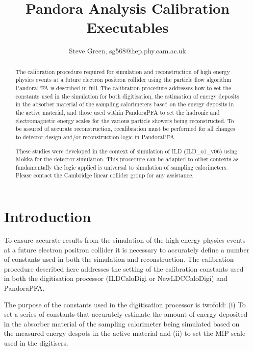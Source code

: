 \documentclass[11pt, oneside]{article}   	%
\title{Pandora Analysis Calibration Executables}
\author{Steve Green, sg568@hep.phy.cam.ac.uk}
\date{}							%
\begin{document}
\maketitle


\begin{abstract}
The calibration procedure required for simulation and reconstruction of high energy physics events at a future electron positron collider using the particle flow algorithm PandoraPFA is described in full.  The calibration procedure addresses how to set the constants used in the simulation for both digitisation, the estimation of energy deposits in the absorber material of the sampling calorimeters based on the energy deposits in the active material, and those used within PandoraPFA to set the hadronic and electromagnetic energy scales for the various particle showers being reconstructed.  To be assured of accurate reconstruction, recalibration must be performed for all changes to detector design and/or  reconstruction logic in PandoraPFA.

These studies were developed in the context of simulation of ILD (ILD\_o1\_v06) using Mokka for the detector simulation.  This procedure can be adapted to other contexts as fundamentally the logic applied is universal to simulation of sampling calorimeters.  Please contact the Cambridge linear collider group for any assistance.
\end{abstract}


\section{Introduction}

To ensure accurate results from the simulation of the high energy physics events at a future electron positron collider it is necessary to accurately define a number of constants used in both the simulation and reconstruction.  The calibration procedure described here addresses the setting of the calibration constants used in both the digitisation processor (ILDCaloDigi or NewLDCCaloDigi) and PandoraPFA.

The purpose of the constants used in the digitisation processor is twofold: (i) To set a series of constants that accurately estimate the amount of energy deposited in the absorber material of the sampling calorimeter being simulated based on the measured energy despots in the active material and (ii) to set the MIP scale used in the digitisers.
\end{document}
